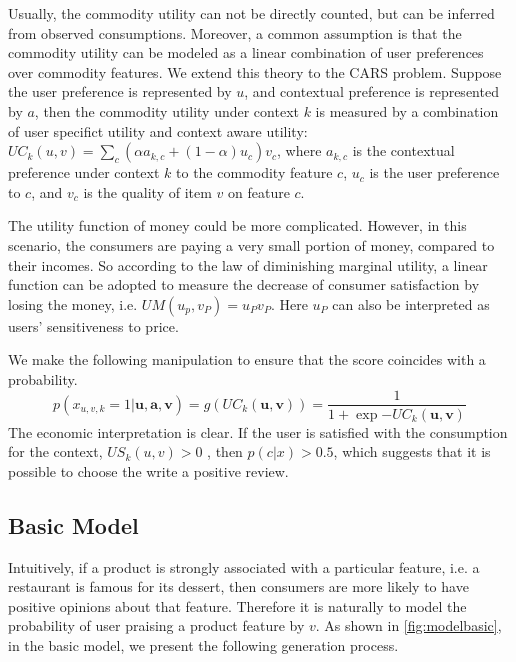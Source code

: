 \documentclass[preprint,12pt]{elsarticle}
\begin{document}
Usually, the commodity utility can not be directly counted, but can be inferred from observed consumptions. Moreover, a common assumption is that the commodity utility can be modeled as a linear combination of user preferences over commodity features. We extend this theory to the CARS problem. Suppose the user preference is represented by $u$, and contextual preference is represented by $a$, then the commodity utility under context $k$ is measured by a combination of user specifict utility and context aware utility: $UC_k(u,v)= \sum_c (\alpha a_{k,c} + (1-\alpha) u_c) v_c$, where $a_{k,c}$ is the contextual preference under context $k$ to the commodity feature $c$, $u_c$ is the user preference to $c$, and $v_c$ is the quality of item $v$ on feature $c$.

The utility function of money could be more complicated. However, in this scenario, the consumers are paying a very small portion of money, compared to their incomes. So according to the law of diminishing marginal utility, a linear function can be adopted to measure the decrease of consumer satisfaction by losing the money, i.e. $UM(u_p,v_P)=u_P v_P$. Here $u_P$ can also be interpreted as users' sensitiveness to price.


We make the following manipulation to ensure that the score coincides with a probability. 
\begin{equation}\label{equ:pcx}
  p(x_{u,v,k}=1|\mathbf{u,a,v})=g(UC_k(\mathbf{u,v}))=\frac{1}{1+\exp{-UC_k(\mathbf{u,v})}}
\end{equation}
The economic interpretation is clear. If the user is satisfied with the consumption for the context, $US_k(u,v)>0$ , then $p(c|x)>0.5$, which suggests that it is possible to choose the write a positive review.

\subsection{Basic Model}

Intuitively,  if a product is strongly associated with a particular feature, i.e. a restaurant is famous for its dessert, then consumers are more likely to have positive opinions about that feature. Therefore it is naturally to model the probability of user praising a product feature by $v$. As shown in \ref{fig:modelbasic}, in the basic model, we present the following generation process.
\end{document}

